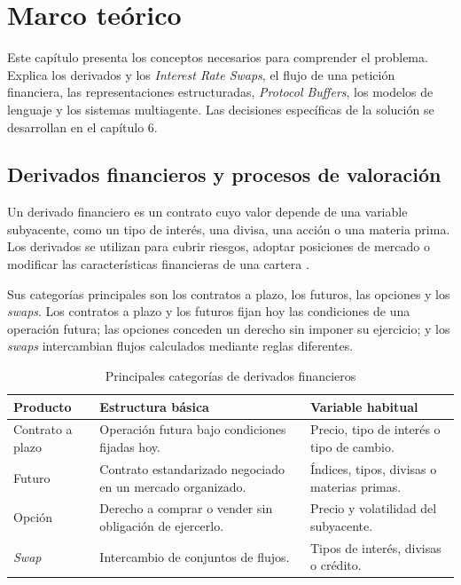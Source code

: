 \chapter{Marco teórico}
\label{cap:marco_teorico}

Este capítulo presenta los conceptos necesarios para comprender el problema. Explica los derivados y los \textit{Interest Rate Swaps}, el flujo de una petición financiera, las representaciones estructuradas, \textit{Protocol Buffers}, los modelos de lenguaje y los sistemas multiagente. Las decisiones específicas de la solución se desarrollan en el capítulo 6.

\section{Derivados financieros y procesos de valoración}
\label{sec:derivados_valoracion}

Un derivado financiero es un contrato cuyo valor depende de una variable subyacente, como un tipo de interés, una divisa, una acción o una materia prima. Los derivados se utilizan para cubrir riesgos, adoptar posiciones de mercado o modificar las características financieras de una cartera \citep{hull2021derivatives}.

Sus categorías principales son los contratos a plazo, los futuros, las opciones y los \textit{swaps}. Los contratos a plazo y los futuros fijan hoy las condiciones de una operación futura; las opciones conceden un derecho sin imponer su ejercicio; y los \textit{swaps} intercambian flujos calculados mediante reglas diferentes.

\begin{table}[H]
\centering
\small
\caption{Principales categorías de derivados financieros}
\label{tab:tipos_derivados}
\begin{tabular}{|P{3.0cm}|P{5.2cm}|P{4.7cm}|}
\hline
\textbf{Producto} & \textbf{Estructura básica} & \textbf{Variable habitual} \\
\hline
Contrato a plazo & Operación futura bajo condiciones fijadas hoy. & Precio, tipo de interés o tipo de cambio. \\
\hline
Futuro & Contrato estandarizado negociado en un mercado organizado. & Índices, tipos, divisas o materias primas. \\
\hline
Opción & Derecho a comprar o vender sin obligación de ejercerlo. & Precio y volatilidad del subyacente. \\
\hline
\textit{Swap} & Intercambio de conjuntos de flujos. & Tipos de interés, divisas o crédito. \\
\hline
\end{tabular}
\end{table}

